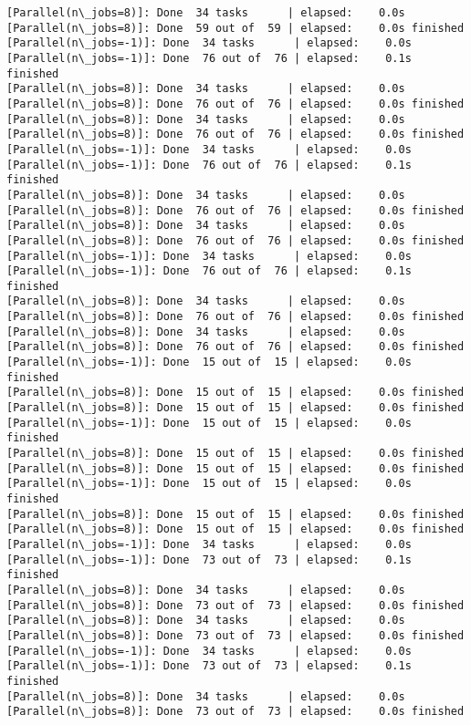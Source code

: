 \documentclass[11pt]{article}
\begin{document}
\begin{Verbatim}[commandchars=\\\{\}]
[Parallel(n\_jobs=8)]: Done  34 tasks      | elapsed:    0.0s
[Parallel(n\_jobs=8)]: Done  59 out of  59 | elapsed:    0.0s finished
[Parallel(n\_jobs=-1)]: Done  34 tasks      | elapsed:    0.0s
[Parallel(n\_jobs=-1)]: Done  76 out of  76 | elapsed:    0.1s finished
[Parallel(n\_jobs=8)]: Done  34 tasks      | elapsed:    0.0s
[Parallel(n\_jobs=8)]: Done  76 out of  76 | elapsed:    0.0s finished
[Parallel(n\_jobs=8)]: Done  34 tasks      | elapsed:    0.0s
[Parallel(n\_jobs=8)]: Done  76 out of  76 | elapsed:    0.0s finished
[Parallel(n\_jobs=-1)]: Done  34 tasks      | elapsed:    0.0s
[Parallel(n\_jobs=-1)]: Done  76 out of  76 | elapsed:    0.1s finished
[Parallel(n\_jobs=8)]: Done  34 tasks      | elapsed:    0.0s
[Parallel(n\_jobs=8)]: Done  76 out of  76 | elapsed:    0.0s finished
[Parallel(n\_jobs=8)]: Done  34 tasks      | elapsed:    0.0s
[Parallel(n\_jobs=8)]: Done  76 out of  76 | elapsed:    0.0s finished
[Parallel(n\_jobs=-1)]: Done  34 tasks      | elapsed:    0.0s
[Parallel(n\_jobs=-1)]: Done  76 out of  76 | elapsed:    0.1s finished
[Parallel(n\_jobs=8)]: Done  34 tasks      | elapsed:    0.0s
[Parallel(n\_jobs=8)]: Done  76 out of  76 | elapsed:    0.0s finished
[Parallel(n\_jobs=8)]: Done  34 tasks      | elapsed:    0.0s
[Parallel(n\_jobs=8)]: Done  76 out of  76 | elapsed:    0.0s finished
[Parallel(n\_jobs=-1)]: Done  15 out of  15 | elapsed:    0.0s finished
[Parallel(n\_jobs=8)]: Done  15 out of  15 | elapsed:    0.0s finished
[Parallel(n\_jobs=8)]: Done  15 out of  15 | elapsed:    0.0s finished
[Parallel(n\_jobs=-1)]: Done  15 out of  15 | elapsed:    0.0s finished
[Parallel(n\_jobs=8)]: Done  15 out of  15 | elapsed:    0.0s finished
[Parallel(n\_jobs=8)]: Done  15 out of  15 | elapsed:    0.0s finished
[Parallel(n\_jobs=-1)]: Done  15 out of  15 | elapsed:    0.0s finished
[Parallel(n\_jobs=8)]: Done  15 out of  15 | elapsed:    0.0s finished
[Parallel(n\_jobs=8)]: Done  15 out of  15 | elapsed:    0.0s finished
[Parallel(n\_jobs=-1)]: Done  34 tasks      | elapsed:    0.0s
[Parallel(n\_jobs=-1)]: Done  73 out of  73 | elapsed:    0.1s finished
[Parallel(n\_jobs=8)]: Done  34 tasks      | elapsed:    0.0s
[Parallel(n\_jobs=8)]: Done  73 out of  73 | elapsed:    0.0s finished
[Parallel(n\_jobs=8)]: Done  34 tasks      | elapsed:    0.0s
[Parallel(n\_jobs=8)]: Done  73 out of  73 | elapsed:    0.0s finished
[Parallel(n\_jobs=-1)]: Done  34 tasks      | elapsed:    0.0s
[Parallel(n\_jobs=-1)]: Done  73 out of  73 | elapsed:    0.1s finished
[Parallel(n\_jobs=8)]: Done  34 tasks      | elapsed:    0.0s
[Parallel(n\_jobs=8)]: Done  73 out of  73 | elapsed:    0.0s finished

\end{Verbatim}
\end{document}
